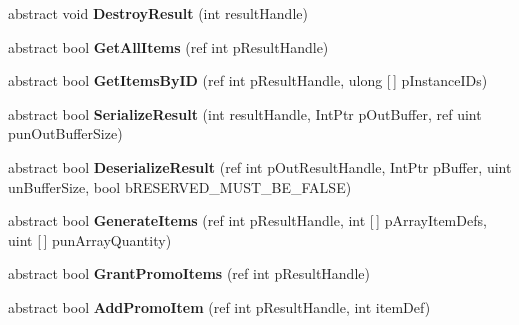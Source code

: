 \begin{DoxyCompactItemize}
abstract void {\bfseries Destroy\+Result} (int result\+Handle)
\item 
\mbox{\label{class_valve_1_1_steamworks_1_1_i_steam_inventory_a291f8f29df629f31eaf885ce8835f664}} 
abstract bool {\bfseries Get\+All\+Items} (ref int p\+Result\+Handle)
\item 
\mbox{\label{class_valve_1_1_steamworks_1_1_i_steam_inventory_ac0f4f8e6a630ba5969ec7e11c9567962}} 
abstract bool {\bfseries Get\+Items\+By\+ID} (ref int p\+Result\+Handle, ulong \mbox{[}$\,$\mbox{]} p\+Instance\+I\+Ds)
\item 
\mbox{\label{class_valve_1_1_steamworks_1_1_i_steam_inventory_a04372cad5c10418482108963e8bfbcbb}} 
abstract bool {\bfseries Serialize\+Result} (int result\+Handle, Int\+Ptr p\+Out\+Buffer, ref uint pun\+Out\+Buffer\+Size)
\item 
\mbox{\label{class_valve_1_1_steamworks_1_1_i_steam_inventory_a564b0e694f5893ce6909bada77fa7396}} 
abstract bool {\bfseries Deserialize\+Result} (ref int p\+Out\+Result\+Handle, Int\+Ptr p\+Buffer, uint un\+Buffer\+Size, bool b\+R\+E\+S\+E\+R\+V\+E\+D\+\_\+\+M\+U\+S\+T\+\_\+\+B\+E\+\_\+\+F\+A\+L\+SE)
\item 
\mbox{\label{class_valve_1_1_steamworks_1_1_i_steam_inventory_ab54cb8d6d44e25d814c1b1f83b728b73}} 
abstract bool {\bfseries Generate\+Items} (ref int p\+Result\+Handle, int \mbox{[}$\,$\mbox{]} p\+Array\+Item\+Defs, uint \mbox{[}$\,$\mbox{]} pun\+Array\+Quantity)
\item 
\mbox{\label{class_valve_1_1_steamworks_1_1_i_steam_inventory_a7ad0b246a8de397929482a982bcb47ee}} 
abstract bool {\bfseries Grant\+Promo\+Items} (ref int p\+Result\+Handle)
\item 
\mbox{\label{class_valve_1_1_steamworks_1_1_i_steam_inventory_a0b3533ad6195af2bfff5c0ce5845aee1}} 
abstract bool {\bfseries Add\+Promo\+Item} (ref int p\+Result\+Handle, int item\+Def)
\item 

\end{DoxyCompactItemize}
